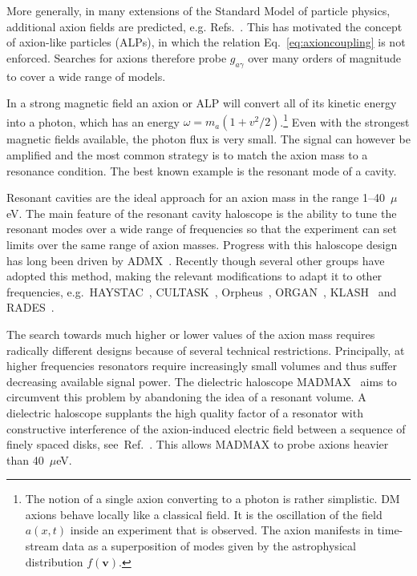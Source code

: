 \documentclass[prd,10pt,twocolumn,showpacs,nofootinbib,aps,superscriptaddress,preprintnumbers]{revtex4-1}
\begin{document}
More generally, in many extensions of the Standard Model of particle physics,
additional axion fields are predicted, e.g. Refs.~\cite{Svrcek:2006yi,Arvanitaki:2009fg,Jaeckel:2010ni,Cicoli:2012sz,Nelson:1993nf,Chikashige:1980ui}.
This has motivated the concept of axion-like particles (ALPs),
in which the relation Eq.~\eqref{eq:axioncoupling} is not enforced.
Searches for axions therefore probe $g_{a\gamma}$ over many orders
of magnitude to cover a wide range of models.

In a strong magnetic field an axion or ALP will convert all of its kinetic energy into a photon, which has an energy
$\omega = m_a(1+v^2/2)$.\footnote{
The notion of a single axion converting to a photon is rather simplistic. 
DM axions behave locally like a classical field. It is the 
oscillation of the field $a(x,t)$ inside an experiment that is observed.
The axion manifests in time-stream data as a superposition of modes given by the astrophysical distribution $f(\mathbf{v})$.}
Even with the strongest magnetic fields available, the photon flux is very small. 
The signal can however be amplified and 
the most common strategy is to match the axion mass to a resonance condition. 
The best known example is the resonant mode of a cavity.

Resonant cavities are the ideal approach for an axion mass in the range 1--40~$\mu$eV. The main feature of the resonant cavity haloscope is the ability to tune the resonant modes over a wide range of frequencies so that the experiment can set limits over the same range of axion masses. Progress with this haloscope design has long been driven by ADMX~\cite{Asztalos:2009yp,Du:2018uak}. 
Recently though several other groups have adopted this method, 
making the relevant modifications to adapt it to other frequencies, e.g.\ HAYSTAC~\cite{Brubaker:2016ktl,Rapidis:2017ytq,Brubaker:2017rna,Zhong:2017fot,Brubaker:2018ebj}, CULTASK~\cite{Chung:2016ysi,Lee:2017mff,Chung:2017ibl}, 
Orpheus~\cite{Rybka:2014cya}, 
ORGAN~\cite{McAllister:2017lkb,McAllister:2017ern}, 
KLASH~\cite{Alesini:2017ifp} and RADES~\cite{Melcon:2018dba}. 

The search towards much higher or lower values of the axion mass requires radically different designs because of several technical restrictions. 
Principally, at higher frequencies resonators require increasingly small volumes and thus suffer decreasing available signal power. 
The dielectric haloscope MADMAX~\cite{TheMADMAXWorkingGroup:2016hpc,MADMAXinterestGroup:2017bgn,Millar:2016cjp}
 aims to circumvent this problem by abandoning the idea of a resonant volume. 
 A dielectric haloscope supplants the high quality factor of a resonator with constructive 
 interference of the axion-induced electric field between a sequence of finely spaced disks, see~Ref.~\cite{Millar:2016cjp}.
 This allows MADMAX to probe axions heavier than 40~$\mu$eV.
\end{document}
